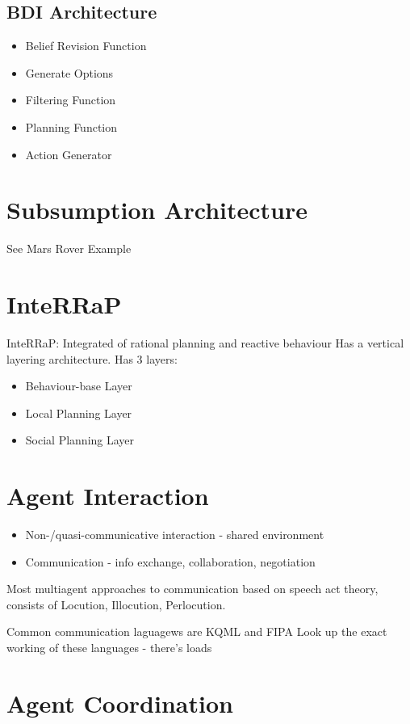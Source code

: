 \documentclass{article}
\begin{document}
\subsection{BDI Architecture}
\begin{itemize}
    \item Belief Revision Function
    \item Generate Options
    \item Filtering Function
    \item Planning Function
    \item Action Generator
\end{itemize}

\section{Subsumption Architecture}
See Mars Rover Example

\section{InteRRaP}
InteRRaP: Integrated of rational planning and reactive behaviour
Has a vertical layering architecture.
Has 3 layers:
\begin{itemize}
    \item Behaviour-base Layer
    \item Local Planning Layer
    \item Social Planning Layer
\end{itemize}

\section{Agent Interaction}
\begin{itemize}
    \item Non-/quasi-communicative interaction - shared environment
    \item Communication - info exchange, collaboration, negotiation
\end{itemize}
Most multiagent approaches to communication based on speech act theory,
consists of Locution, Illocution, Perlocution.

Common communication laguagews are KQML and FIPA
Look up the exact working of these languages - there's loads

\section{Agent Coordination}
\end{document}
